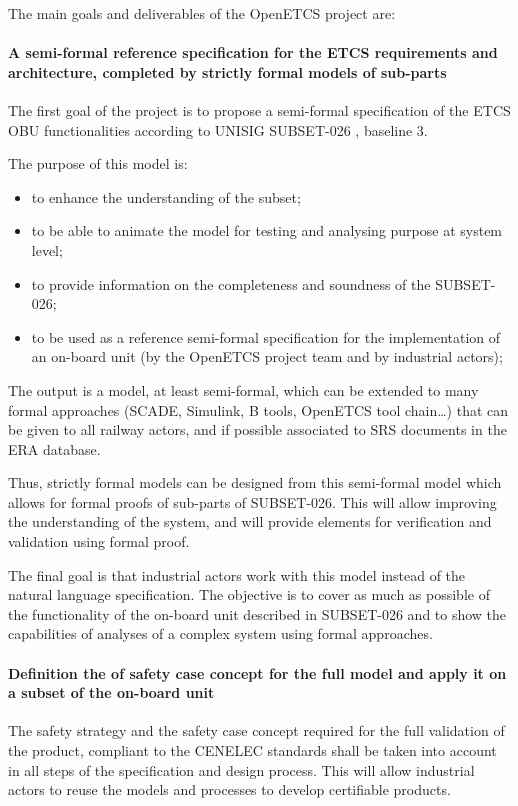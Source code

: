\documentclass{template/openetcs_article}
\begin{document}
The main goals and deliverables of the OpenETCS project are:

\paragraph{A semi-formal reference specification for the ETCS requirements and architecture, completed by strictly formal models of sub-parts}
The first goal of the project is to propose a semi-formal specification of the \gls{ETCS} \gls{OBU} functionalities according to UNISIG SUBSET-026 \citep{subset026}, baseline 3.

The purpose of this model is:
\begin{itemize}
\item to enhance the understanding of the subset;
\item to be able to animate the model for testing and analysing purpose at system level;
\item to provide information on the completeness and soundness of the SUBSET-026;
\item to be used as a reference semi-formal specification for the implementation of an on-board unit
(by the OpenETCS project team and by industrial actors);
\end{itemize}

The output is a model, at least semi-formal, which can be extended to many formal approaches (SCADE,
Simulink, B tools, OpenETCS tool chain…) that can be given to all railway actors, and
if possible associated to SRS documents in the ERA database.

Thus, strictly formal models can be designed from this semi-formal model which allows for formal proofs of sub-parts of SUBSET-026. This will allow improving the understanding of the system, and will provide elements for verification and validation using formal proof.

The final goal is that industrial actors work with this model instead of the
natural language specification.
The objective is to cover as much as possible of the functionality of the on-board unit described in SUBSET-026 and to show the capabilities of analyses of a complex system using formal approaches.


\paragraph{Definition the of safety case concept for the full model and apply it on a subset of the on-board unit}
The safety strategy and the safety case concept required for the full validation of the product, compliant to the CENELEC standards shall be taken into account in all steps of the specification and design process. This will allow industrial actors to reuse the models and processes to develop certifiable products.
\end{document}
